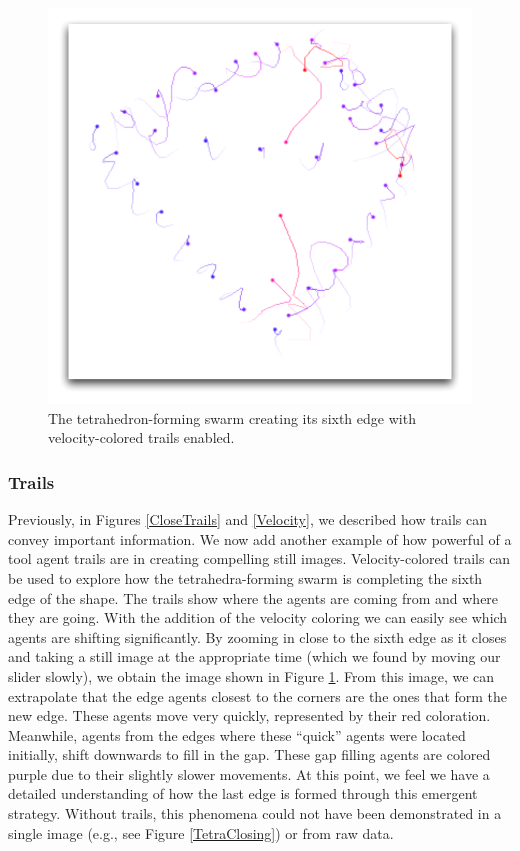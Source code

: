 \documentclass{vgtc}
\begin{document}
\begin{figure}
\centering
\includegraphics[scale=.5]{images/tetrastrategy.pdf}
\caption{
The tetrahedron-forming swarm creating its sixth edge with velocity-colored trails enabled.
}
\label{TetraStrategy}
\end{figure}

\subsubsection{Trails}

Previously, in Figures \ref{CloseTrails} and \ref{Velocity}, we described how trails can convey important information.
We now add another example of how powerful of a tool agent trails are in creating compelling still images.
Velocity-colored trails can be used to explore how the tetrahedra-forming swarm is completing the sixth edge of the shape.
The trails show where the agents are coming from and where they are going.
With the addition of the velocity coloring we can easily see which agents are shifting significantly.
By zooming in close to the sixth edge as it closes and taking a still image at the appropriate time (which we found
by moving our slider slowly), we obtain the image shown in Figure \ref{TetraStrategy}.
From this image, we can extrapolate that the edge agents closest to the corners are the ones that form the new edge.
These agents move very quickly, represented by their red coloration.
Meanwhile, agents from the edges where these ``quick'' agents were located initially, shift downwards to fill in the gap.
These gap filling agents are colored purple due to their slightly slower movements.
At this point, we feel we have a detailed understanding of how the last edge is formed through this emergent strategy.
Without trails, this phenomena could not have been demonstrated in a single image (e.g., see Figure \ref{TetraClosing})
or from raw data.
\end{document}
